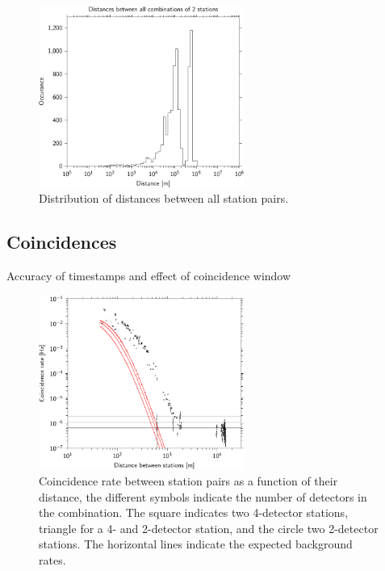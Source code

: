 \begin{figure}
    \centering
    \includegraphics[width=0.6\textwidth]
                    {plots/experiment/network_station_distances}
    \caption{Distribution of distances between all station pairs.}
    \label{fig:network-distances}
\end{figure}



\subsection{Coincidences}

Accuracy of timestamps and effect of coincidence window

\begin{figure}
    \centering
    \includegraphics[width=0.6\textwidth]
                    {plots/experiment/distance_v_coincidence_rate}
    \caption{Coincidence rate between station pairs as a function of their distance, the different symbols indicate the number of detectors in the combination. The square indicates two 4-detector stations, triangle for a 4- and 2-detector station, and the circle two 2-detector stations. The horizontal lines indicate the expected background rates.}
    \label{fig:network-distances}
\end{figure}


